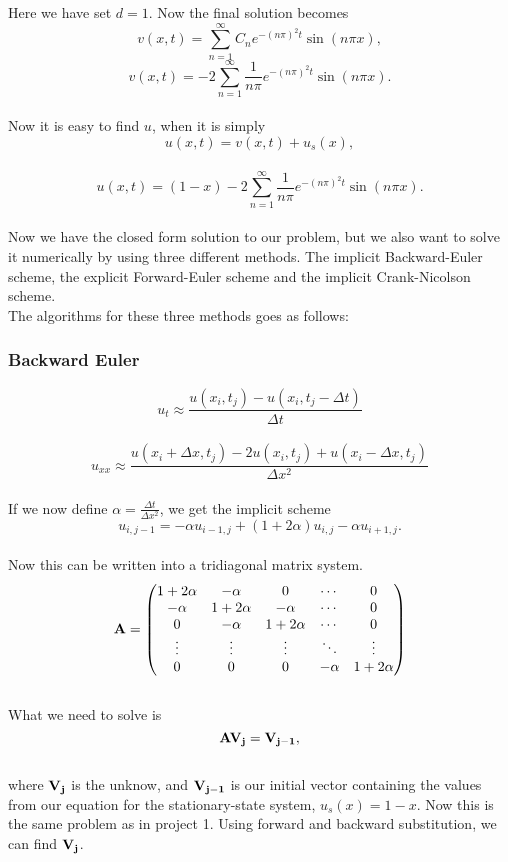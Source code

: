 \documentclass[a4paper,12pt, english]{article}
\begin{document}
Here we have set $d=1$. Now the final solution becomes
\\
$$v(x,t) = \sum_{n=1}^{\infty} C_n e^{-\left( n \pi\right)^2 t} \sin(n \pi x),$$
$$v(x,t) = -2 \sum_{n=1}^{\infty} \frac{1}{n \pi} e^{-\left( n \pi\right)^2 t} \sin(n \pi x).$$
\\
Now it is easy to find  $u$, when it is simply
\\
$$u(x,t) = v(x,t) + u_s(x),$$
\\
$$u(x,t) = (1 - x) -2 \sum_{n=1}^{\infty} \frac{1}{n \pi} e^{-\left( n \pi\right)^2 t} \sin(n \pi x).$$
\\
Now we have the closed form solution to our problem, but we also want to solve it numerically by using three different methods. The implicit Backward-Euler scheme, the explicit Forward-Euler scheme and the implicit Crank-Nicolson scheme. 
\\
The algorithms for these three methods goes as follows:

\subsubsection*{Backward Euler}
$$u_t \approx \frac{u(x_i,t_j) - u(x_i,t_j - \Delta t)}{\Delta t}$$
\\
$$u_{xx} \approx \frac{u(x_i + \Delta x,t_j) - 2u(x_i,t_j) + u(x_i - \Delta x,t_j)}{\Delta x^2}$$
\\
If we now define $\alpha = \frac{\Delta t}{\Delta x^2}$, we get the implicit scheme
\\
$$ u_{i,j-1} = -\alpha u_{i-1,j} + (1 + 2\alpha)u_{i,j} - \alpha u_{i+1,j}.$$
\\
Now this can be written into a tridiagonal matrix system.
\\
$$\bf A = \begin{pmatrix}
1 + 2\alpha & -\alpha & 0 & \cdots & 0 \\
-\alpha & 1 + 2\alpha & -\alpha & \cdots & 0\\
0 & -\alpha & 1 + 2\alpha & \cdots & 0\\
\vdots  & \vdots  & \vdots & \ddots & \vdots  \\
0 & 0 & 0 & -\alpha & 1 + 2\alpha
\end{pmatrix}
$$
\\
What we need to solve is 
\\
$$\bf A \bf V_j = \bf V_{j-1},$$
\\
where $\bf V_j$ is the unknow, and $\bf V_{j-1}$ is our initial vector containing the values from our equation for the stationary-state system, $u_s(x) = 1 - x$. Now this is the same problem as in project 1. Using forward and backward substitution, we can find $\bf V_j$.
\end{document}
